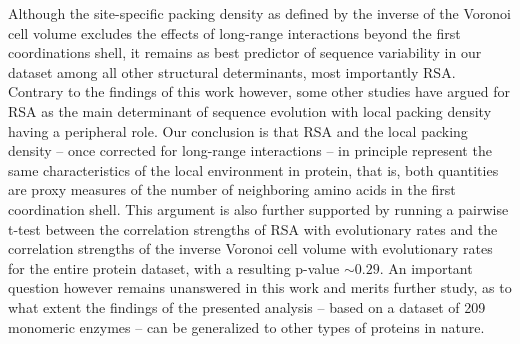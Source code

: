 \documentclass[11pt]{article}
\begin{document}
    Although the site-specific packing density as defined by the inverse of the Voronoi cell volume excludes the effects of long-range interactions beyond the first coordinations shell, it remains as best predictor of sequence variability in our dataset among all other structural determinants, most importantly RSA. Contrary to the findings of this work however, some other studies \citep[e.g., ][]{franzosa_structural_2009, scherrer_modeling_2012, shahmoradi_predicting_2014} have argued for RSA as the main determinant of sequence evolution with local packing density having a peripheral role. Our conclusion is that RSA and the local packing density -- once corrected for long-range interactions -- in principle represent the same characteristics of the local environment in protein, that is, both quantities are proxy measures of the number of neighboring amino acids in the first coordination shell. This argument is also further supported by running a pairwise t-test between the correlation strengths of RSA with evolutionary rates and the correlation strengths of the inverse Voronoi cell volume with evolutionary rates for the entire protein dataset, with a resulting p-value $\sim0.29$. An important question however remains unanswered in this work and merits further study, as to what extent the findings of the presented analysis -- based on a dataset of 209 monomeric enzymes -- can be generalized to other types of proteins in nature.
\end{document}
